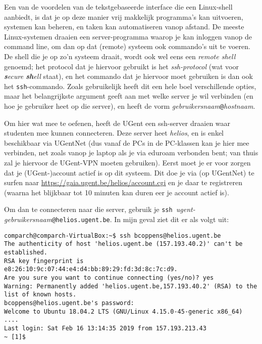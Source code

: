 \documentclass[a4paper,twoside,openany]{memoir}
\begin{document}
Een van de voordelen van de tekstgebaseerde interface die een Linux-shell
aanbiedt, is dat je op deze manier vrij makkelijk programma's kan uitvoeren,
systemen kan beheren, en taken kan automatiseren vanop afstand. De meeste
Linux-systemen draaien een server-programma waarop je kan inloggen vanop de
command line, om dan op dat (remote) systeem ook commando's uit te voeren. De
shell die je op zo'n systeem draait, wordt ook wel eens een \emph{remote shell}
genoemd; het protocol dat je hiervoor gebruikt is het \emph{ssh-protocol} (wat
voor \emph{\textbf{s}ecure \textbf{sh}ell} staat), en het commando dat je
hiervoor moet gebruiken is dan ook het \verb!ssh!-commando. Zoals gebruikelijk
heeft dit een hele boel verschillende opties, maar het belangrijkste argument
geeft aan met welke server je wil verbinden (en hoe je gebruiker heet op
die server), en heeft de vorm \emph{gebruikersnaam}\verb!@!\emph{hostnaam}.

Om hier wat mee te oefenen, heeft de UGent een ssh-server draaien waar
studenten mee kunnen connecteren. Deze server heet \emph{helios}, en is enkel
beschikbaar via UGentNet (dus vanaf de PCs in de PC-klassen kan je hier mee
verbinden, net zoals vanop je laptop als je via eduroam verbonden bent; van
thuis zal je hiervoor de UGent-VPN moeten gebruiken). Eerst moet je er voor
zorgen dat je \mbox{(UGent-)account} actief is op dit systeem. Dit doe je via
(op UGentNet) te surfen naar \url{https://gaia.ugent.be/helios/account.cgi} en
je daar te registreren (waarna het blijkbaar tot 10 minuten kan duren eer je
account actief is).

Om dan te connecteren naar die server, gebruik je \verb!ssh !\emph{ugent-gebruikersnaam}\verb!@helios.ugent.be!. In mijn geval ziet dit er als volgt uit:
\begin{verbatim}
comparch@comparch-VirtualBox:~$ ssh bcoppens@helios.ugent.be
The authenticity of host 'helios.ugent.be (157.193.40.2)' can't be established.
RSA key fingerprint is e8:26:10:9c:07:44:e4:d4:bb:89:29:fd:3d:8c:7c:d9.
Are you sure you want to continue connecting (yes/no)? yes
Warning: Permanently added 'helios.ugent.be,157.193.40.2' (RSA) to the list of known hosts.
bcoppens@helios.ugent.be's password:
Welcome to Ubuntu 18.04.2 LTS (GNU/Linux 4.15.0-45-generic x86_64)
....
Last login: Sat Feb 16 13:14:35 2019 from 157.193.213.43
~ [1]$
\end{verbatim}
\end{document}
